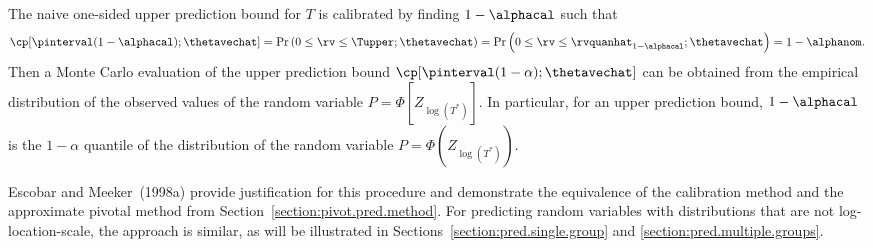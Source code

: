 The naive one-sided upper prediction bound for $T$ is calibrated by
finding $1-\alphacal$ such that
\begin{equation}
\label{equation:calibration.upper.def}
\cp[\pinterval(1-\alphacal) ;\thetavechat] =
\Pr \left(0 \leq \rv \leq \Tupper ; \thetavechat \right)
= \Pr \left(0 \leq \rv \leq \rvquanhat_{1 - \alphacal}  ; \thetavechat \right) 
=  1-\alphanom.
\end{equation}
Then a Monte Carlo evaluation of the upper prediction bound
$\cp[\pinterval(1-\alpha) ;\thetavechat]$ can be obtained from the
empirical distribution of the observed values of the random variable
$P=\Phi[Z_{\log(T^{*})}]$. In particular, for an upper prediction
bound, $1-\alphacal$ is the $1-\alpha$ quantile of the distribution
of the random variable $P=\Phi(Z_{\log(T^{*})})$.

Escobar and Meeker~(1998a)
provide justification for this procedure and demonstrate the
equivalence of the calibration method and the approximate pivotal method
from Section~\ref{section:pivot.pred.method}.   For 
predicting random variables with distributions that are
not log-location-scale, the approach is similar, as will be
illustrated in Sections~\ref{section:pred.single.group} and
\ref{section:pred.multiple.groups}.


